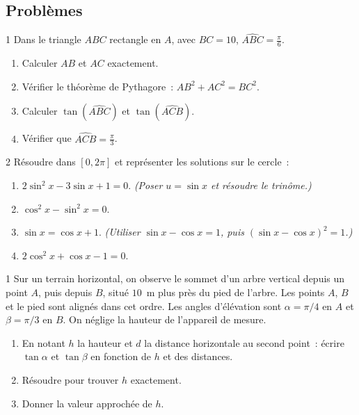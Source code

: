 \subsection*{Probl\`emes}

\begin{probleme}{1}
Dans le triangle $ABC$ rectangle en $A$, avec $BC=10$, $\widehat{ABC}=\frac{\pi}{6}$.
\begin{enumerate}
  \item Calculer $AB$ et $AC$ exactement.
  \item V\'erifier le th\'eor\`eme de Pythagore~: $AB^2+AC^2=BC^2$.
  \item Calculer $\tan(\widehat{ABC})$ et $\tan(\widehat{ACB})$.
  \item V\'erifier que $\widehat{ACB} = \frac{\pi}{3}$.
\end{enumerate}
\end{probleme}

\begin{probleme}{2}
R\'esoudre dans $[0,2\pi]$ et repr\'esenter les solutions sur le cercle~:
\begin{enumerate}
  \item $2\sin^2 x - 3\sin x + 1 = 0$.
        \emph{(Poser $u=\sin x$ et r\'esoudre le trin\^ome.)}
  \item $\cos^2 x - \sin^2 x = 0$.
  \item $\sin x = \cos x + 1$.
        \emph{(Utiliser $\sin x - \cos x = 1$, puis $(\sin x-\cos x)^2=1$.)}
  \item $2\cos^2 x + \cos x - 1 = 0$.
\end{enumerate}
\end{probleme}

\begin{probleme}{1}
Sur un terrain horizontal, on observe le sommet d'un arbre vertical depuis
un point $A$, puis depuis $B$, situ\'e $10$~m plus pr\`es du pied de l'arbre.
Les points $A$, $B$ et le pied sont align\'es dans cet ordre.
Les angles d'\'el\'evation sont $\alpha=\pi/4$ en $A$ et $\beta=\pi/3$ en $B$.
On n\'eglige la hauteur de l'appareil de mesure.
\begin{enumerate}
  \item En notant $h$ la hauteur et $d$ la distance horizontale au second point~:
        \'ecrire $\tan\alpha$ et $\tan\beta$ en fonction de $h$ et des distances.
  \item R\'esoudre pour trouver $h$ exactement.
  \item Donner la valeur approch\'ee de $h$.
\end{enumerate}
\end{probleme}

